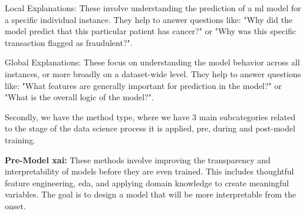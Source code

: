 Local Explanations: These involve understanding the prediction of a \ac{ml} model for a specific individual instance. They help to answer questions like: "Why did the model predict that this particular patient has cancer?" or "Why was this specific transaction flagged as fraudulent?". 

Global Explanations: These focus on understanding the model behavior across all instances, or more broadly on a dataset-wide level. They help to answer questions like: "What features are generally important for prediction in the model?" or "What is the overall logic of the model?". 

Secondly, we have the method type, where we have 3 main subcategories related to the stage of the data science process it is applied, pre, during and post-model training.

\textbf{Pre-Model \ac{xai}:} These methods involve improving the transparency and interpretability of models before they are even trained. This includes thoughtful feature engineering, \ac{eda}, and applying domain knowledge to create meaningful variables. The goal is to design a model that will be more interpretable from the onset.

